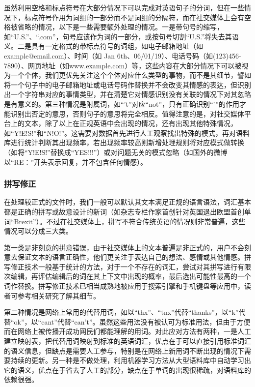 虽然利用空格和标点符号在大部分情况下可以完成对英语句子的分词，但在一些情况下，标点符号作用为词组的一部分而不是词组的分隔符，而在社交媒体上会有空格被省略的情况，以下是一些需要额外处理的情况\cite{jackson2007natural}\cite{mitkov2004oxford}。一是带句号的缩写，如“U.S.”、“.com”，句号应该作为词的一部分，或按句号切割“U.S.”将失去其语义。二是具有一定格式的带标点符号的词组，如电子邮箱地址（如example@email.com）、时间（如 Jan 6th、06/01/19）、电话号码（如(123)456-7890）、网页地址（如www.example.com）等，这些内容在大部分情况下可以被视为一个个体，我们更优先关注这个个体对应什么类型的事物，而不是其细节，譬如将一个句子中的电子邮箱地址或电话号码作替换并不会改变其情感的表达，但识别出一个字符串对应的事情类型，并在清楚它对情感识别没有关联的情况下对其忽略是有意义的。第三种情况是附属词，如“'t”对应“not”，只有正确识别“'”的作用才能识别出否定的意思，否则句子的意思将完全相反。值得注意的是，对社交媒体平台上的文本，除了以上在正规英语中会出现的情况，还有出现其他特殊情况，如“Y!E!S!”和“N!O!”。这需要对数据首先进行人工观察找出特殊的模式，再对语料库进行统计判断其出现频率，若出现频率较高则新增处理规则将对应模式做转换（如将“Y!E!S!”替换成“YES!!!”）或对问题无关的模式忽略（如国外的微博以“RE：”开头表示回复，并不包含任何情感）。

\subsubsection{拼写修正}

在处理较正式的文件时，我们一般可以默认其文本满足正规的语言语法，词汇基本都是正确的拼写或故意设计的新词（如杂志专栏作家首创针对英国退出欧盟首创单词“Brexit”）。不过在社交媒体上，拼写不符合传统英语的情况则非常普遍，这些情况可以分成三大类。

第一类是非刻意的拼意错误，由于社交媒体上的文本普遍是非正式的，用户不会刻意去保证文本的语言正确性，他们更关注于表达自己的想法、感情或其他情感。拼写修正技术一般基于统计的方法，对于一个不存在的词汇，尝试对其拼写进行有限次编辑，再评估编辑后的词在其上下文中出现的概率，最后选出可能性最高的一个词作替换。拼写修正技术已相当成熟地被应用于搜索引擎和手机键盘等应用中，读者可参考相关研究\cite{ahmed2009revised}\cite{nejja2015context}了解其细节。

第二种情况是网络上常用的代替用词，如以“thx”、“tnx”代替“thanks”，以“k”代替“ok”，以“cant”代替“can't”。虽然这些用法没有被认可为标准用法，但由于方便而在网络上被传播开成功网民们都能理解的用词。对此应对方法有两种，一是人工建立映射表，把代替用词映射到标准的英语词汇，优点在于可以直接引用标准词汇的语义信息，但缺点是需要人工参与，特别是在网络上新用词不断出现的情况下需要持续的更新。另一种是不做处理，利用机器学习方法从大型语料库中自动学习出它的语义，优点在于省去了人工的部分，缺点在于单词的出现很稀疏，对语料库的依赖很强。

